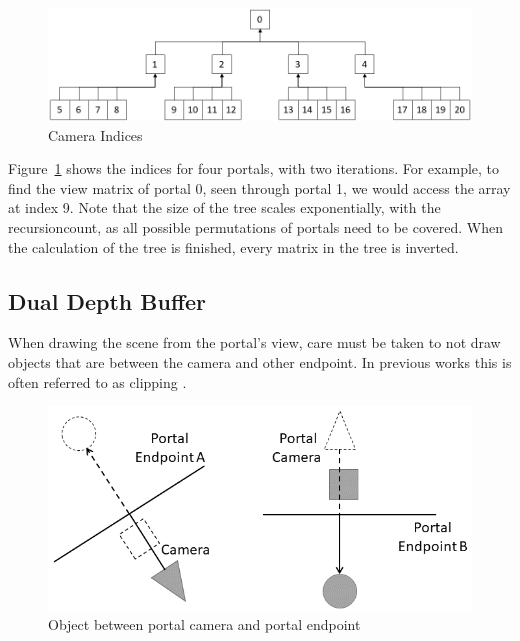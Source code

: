 
\begin{figure}[h]
	\includegraphics[width=\linewidth]{images/cameraindices.png}
	\caption{Camera Indices}
	\label{fig:cameraindices}
\end{figure}

Figure~\ref{fig:cameraindices} shows the indices for four portals, with two iterations. For example, to find the view matrix of portal 0, seen through portal 1, we would access the array at index 9. Note that the size of the tree scales exponentially, with the \gls{recursioncount}, as all possible permutations of portals need to be covered. When the calculation of the tree is finished, every matrix in the tree is inverted.


\subsection{Dual Depth Buffer}

When drawing the scene from the portal's view, care must be taken to not draw objects that are between the camera and other endpoint. In previous works this is often referred to as clipping \cite{lowe:2005:technique}.
\begin{figure}[h]
	\includegraphics[width=\linewidth]{images/bananajuce.png}
	\caption{Object between portal camera and portal endpoint}
	\label{fig:bananajuce}
\end{figure}

